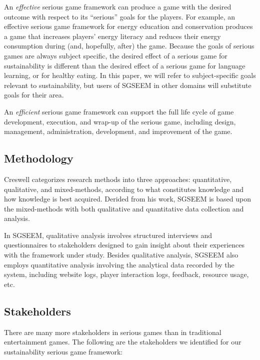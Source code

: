 \documentclass{sigchi}
\begin{document}
An \emph{effective} serious game framework can produce a game with the desired outcome
with respect to its ``serious'' goals for the players. For example, an effective serious
game framework for energy education and conservation produces a game that increases
players' energy literacy and reduces their energy consumption during (and, hopefully,
after) the game. Because the goals of serious games are always subject specific, the
desired effect of a serious game for sustainability is different than the desired effect
of a serious game for language learning, or for healthy eating.  In this paper, we will 
refer to subject-specific goals relevant to sustainability, but users of SGSEEM in other
domains will substitute goals for their area. 

An \emph{efficient} serious game framework can support the
full life cycle of game development, execution, and wrap-up of the
serious game, including design, management, administration, development,
and improvement of the game.

\subsection{Methodology}

Creswell \cite{creswell2003} categorizes research methods into three approaches:
quantitative, qualitative, and mixed-methods, according to what constitutes knowledge
and how knowledge is best acquired. Derided from his work, SGSEEM is based upon the mixed-methods with both qualitative and quantitative data collection and analysis.

In SGSEEM, qualitative analysis involves structured interviews and questionnaires to stakeholders designed to gain insight about their experiences with the
framework under study. Besides qualitative analysis, SGSEEM also employs quantitative analysis involving the analytical data recorded by the system, including website logs, player interaction logs, feedback, resource usage, etc.

\subsection{Stakeholders}

There are many more stakeholders in serious games than in traditional entertainment
games. The following are the stakeholders we identified for our sustainability serious game framework:
\end{document}
